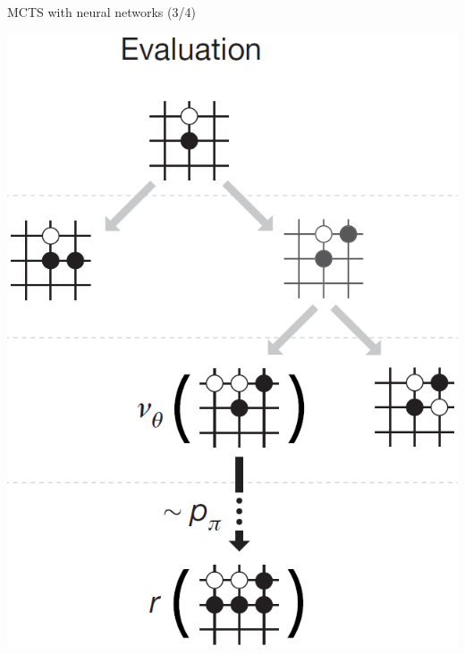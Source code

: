 \documentclass{beamer}
\begin{document}
{    \begin{frame}{MCTS with neural networks (3/4)}
      \begin{center}
        \includegraphics[height=.85\textheight]{../img/MCTS_evaluation.png}
      \end{center}
    \end{frame}

}
\end{document}
